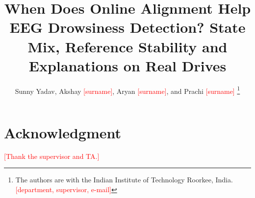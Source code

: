 \documentclass[journal]{IEEEtran}
\newcommand{\todo}[1]{\textcolor{red}{[#1]}}
\begin{document}
\title{When Does Online Alignment Help EEG Drowsiness Detection? State Mix, Reference Stability and Explanations on Real Drives}

\author{Sunny Yadav, Akshay \todo{surname}, Aryan \todo{surname}, and Prachi \todo{surname}%
\thanks{The authors are with the Indian Institute of Technology Roorkee, India. \todo{department, supervisor, e-mail}}}

\maketitle








\section*{Acknowledgment}
\todo{Thank the supervisor and TA.}



\end{document}
